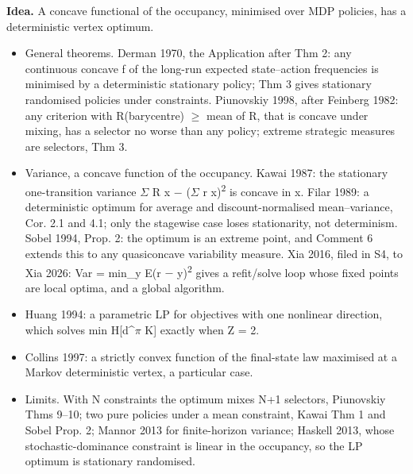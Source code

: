 \documentclass[10pt]{article}
\begin{document}
\textbf{Idea.} A concave functional of the occupancy, minimised over MDP policies, has a deterministic vertex optimum.
\begin{itemize}[nosep,leftmargin=1.2em]
\item General theorems. Derman 1970, the Application after Thm 2: any continuous concave f of the long-run expected state--action frequencies is minimised by a deterministic stationary policy; Thm 3 gives stationary randomised policies under constraints. Piunovskiy 1998, after Feinberg 1982: any criterion with R(barycentre) \ensuremath{\geq} mean of R, that is concave under mixing, has a selector no worse than any policy; extreme strategic measures are selectors, Thm 3.
\item Variance, a concave function of the occupancy. Kawai 1987: the stationary one-transition variance \ensuremath{\Sigma} R x \ensuremath{-} (\ensuremath{\Sigma} r x)\textsuperscript{2} is concave in x. Filar 1989: a deterministic optimum for average and discount-normalised mean--variance, Cor. 2.1 and 4.1; only the stagewise case loses stationarity, not determinism. Sobel 1994, Prop. 2: the optimum is an extreme point, and Comment 6 extends this to any quasiconcave variability measure. Xia 2016, filed in S4, to Xia 2026: Var = min\_y E(r \ensuremath{-} y)\textsuperscript{2} gives a refit/solve loop whose fixed points are local optima, and a global algorithm.
\item Huang 1994: a parametric LP for objectives with one nonlinear direction, which solves min H[d\^{}\ensuremath{\pi} K] exactly when \textbar{}Z\textbar{} = 2.
\item Collins 1997: a strictly convex function of the final-state law maximised at a Markov deterministic vertex, a particular case.
\item Limits. With N constraints the optimum mixes N+1 selectors, Piunovskiy Thms 9--10; two pure policies under a mean constraint, Kawai Thm 1 and Sobel Prop. 2; Mannor 2013 for finite-horizon variance; Haskell 2013, whose stochastic-dominance constraint is linear in the occupancy, so the LP optimum is stationary randomised.
\end{itemize}
\end{document}
